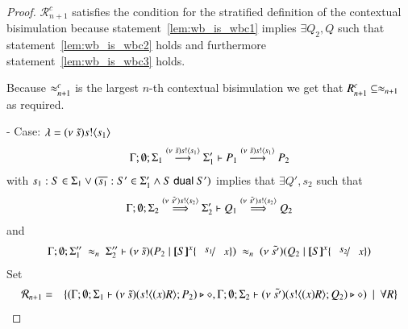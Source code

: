 \begin{proof}
	\noi $\mathcal{R}^c_{n+1}$ satisfies the condition for the stratified definition of the contextual bisimulation because
	statement~\ref{lem:wb_is_wbc1} implies $\exists Q_2, Q$ such that statement~\ref{lem:wb_is_wbc2} holds
	and furthermore statement~\ref{lem:wb_is_wbc3} holds.

	\noi Because $\approx^{c}_{n+1}$ is the largest $n$-th contextual bisimulation we get that $R^c_{n+1} \subseteq \approx_{n+1}$ as required.


	\noi - Case: $\lambda = (\nu\ \tilde{s}) s ! \langle s_1 \rangle$
%
	\begin{eqnarray}
		\Gamma; \emptyset; \Sigma_1 \stackrel{(\nu\ \tilde{s}) s ! \langle s_1 \rangle}{\longrightarrow} \Sigma_1' \vdash P_1 \stackrel{(\nu\ \tilde{s}) s ! \langle s_1 \rangle}{\longrightarrow} P_2 \label{lem:wb_is_wbc4}
	\end{eqnarray}
%
	\noi with $s_1: S \in \Sigma_1 \vee (\overline{s_1}: S' \in \Sigma_1' \wedge S \ \mathsf{dual}\  S')$ implies that
	$\exists Q', s_2$ such that
	\begin{eqnarray}
		\Gamma; \emptyset; \Sigma_2 \stackrel{(\nu\ \tilde{s'}) s ! \langle s_2 \rangle}{\Longrightarrow} \Sigma_2' \vdash Q_1 \stackrel{(\nu\ \tilde{s'}) s ! \langle s_2 \rangle}{\Longrightarrow} Q_2 \label{lem:wb_is_wbc5}
	\end{eqnarray}
	and
%
	\begin{eqnarray*}
		\Gamma; \emptyset; \Sigma_1''\ \wb_{n}\ \Sigma_2'' \proves \newsp{\tilde{s}}{P_2 \Par \map{S}^{x} \subst{s_1}{x}}\ \wb_{n}\ 
		\newsp{\tilde{s'}}{Q_2 \Par \map{S}^{x} \subst{s_2}{x}}
	\end{eqnarray*}
%
	\noi Set
%
	\begin{eqnarray*}
		\mathcal{R}_{n + 1} &=& \{	(\Gamma; \emptyset; \Sigma_1 \vdash (\nu\ \tilde{s})(s ! \langle (x)R \rangle ; P_2) \triangleright \diamond,
						\Gamma; \emptyset; \Sigma_2 \vdash (\nu\ \tilde{s'})(s ! \langle (x)R \rangle ; Q_2) \triangleright \diamond) \ \ |\ \  \forall R\}
	\end{eqnarray*}
%


\end{proof}
